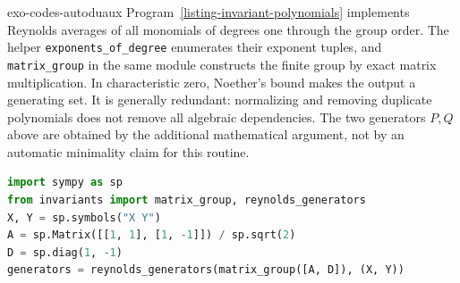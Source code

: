 \begin{correction}{exo-codes-autoduaux}
Program~\ref{listing-invariant-polynomials} implements Reynolds averages
of all monomials of degrees one through the group order. The helper
\texttt{exponents\_of\_degree} enumerates their exponent tuples, and
\texttt{matrix\_group} in the same module constructs the finite group
by exact matrix multiplication. In characteristic zero, Noether's
bound makes the output a generating set. It is generally redundant:
normalizing and removing duplicate polynomials does not remove all
algebraic dependencies. The two generators $P,Q$ above are obtained
by the additional mathematical argument, not by an automatic minimality
claim for this routine.
\begin{lstlisting}[language=Python]
import sympy as sp
from invariants import matrix_group, reynolds_generators
X, Y = sp.symbols("X Y")
A = sp.Matrix([[1, 1], [1, -1]]) / sp.sqrt(2)
D = sp.diag(1, -1)
generators = reynolds_generators(matrix_group([A, D]), (X, Y))
\end{lstlisting}
\begin{listing}[H]

\caption{Exact Reynolds averages giving an overcomplete set of invariant generators.}
\label{listing-invariant-polynomials}
\end{listing}
\end{correction}
